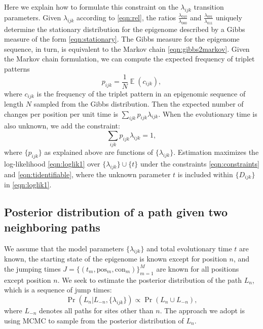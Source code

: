 \documentclass[11pt]{article}
\DeclareMathOperator{\E}{\mathbb{E}}
\newcommand{\context}{\ensuremath{\mathrm{con}}}
\newcommand{\psn}{\ensuremath{\mathrm{pos}}}
\begin{document}
Here we explain how to formulate this constraint on the
$\lambda_{ijk}$ transition parameters. Given $\lambda_{ijk}$ according
to \eqref{eqn:rel}, the ratios $\frac{\lambda_{010}}{\lambda_{000}}$
and $\frac{\lambda_{001}}{\lambda_{011}}$ uniquely determine the
stationary distribution for the epigenome described by a Gibbs measure
of the form \eqref{eqn:stationary}. The Gibbs measure for the
epigenome sequence, in turn, is equivalent to the Markov chain
\eqref{eqn:gibbs2markov}. Given the Markov chain formulation, we can
compute the expected frequency of triplet patterns
\[
p_{ijk} = \frac{1}{N}\E(c_{ijk}),
\]
where $c_{ijk}$ is the frequency of the triplet pattern in an
epigenomic sequence of length $N$ sampled from the Gibbs
distribution. Then the expected number of changes per position per
unit time is $\sum_{ijk}p_{ijk}\lambda_{ijk}$. When the evolutionary
time is also unknown, we add the constraint:
\begin{equation}\label{eqn:tidentifiable}
\sum_{ijk}p_{ijk}\lambda_{ijk} = 1,
\end{equation}
where $\{p_{ijk}\}$ as explained above are functions of
$\{\lambda_{ijk}\}$. Estimation maximizes the log-likelihood
\eqref{eqn:loglik1} over $\{\lambda_{ijk}\}\cup\{t\}$ under the
constraints \eqref{eqn:constraints} and \eqref{eqn:tidentifiable},
where the unknown parameter $t$ is included within $\{D_{ijk}\}$ in
\eqref{eqn:loglik1}.

\subsection{Posterior distribution of a path given two neighboring paths}

We assume that the model parameters $\{\lambda_{ijk}\}$ and total
evolutionary time $t$ are known, the starting state of the epigenome
is known except for position $n$, and the jumping times $J = \{(t_m,
\psn{}_m, \context{}_m) \}_{m=1}^{M}$ are known for all positions
except position $n$. We seek to estimate the posterior distribution of
the path $L_n$, which is a sequence of jump times:
\[
\Pr(L_n|L_{-n}, \{\lambda_{ijk}\}) \propto \Pr(L_n\cup L_{-n}),
\]
where $L_{-n}$ denotes all paths for sites other than $n$.  The
approach we adopt is using MCMC to sample from the posterior
distribution of $L_n$.
\end{document}
